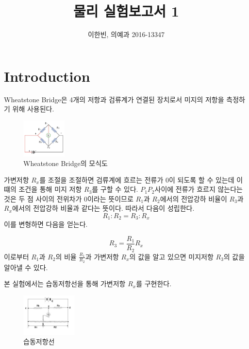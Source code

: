 \documentclass[a4paper]{article}
\title{물리 실험보고서 1}
\author{이한빈, 의예과 2016-13347}
\begin{document}
\maketitle

\section{Introduction}
 	Wheatstone Bridge은 4개의 저항과 검류계가 연결된 장치로서 미지의 저항을 측정하기 위해 사용된다.
 	\begin{figure}[h]
 		\centering
 		\includegraphics[width=0.2\textwidth]{img/wheatstone-bridge.png}
 		\caption{Wheatstone Bridge의 모식도} \label{fig:wheatstone}
 	\end{figure}

 	가변저항 $R_{x}$를 조절을 조절하면 검류계에 흐르는 전류가 0이 되도록 할 수 있는데 이 떄의 조건을 통해 미지 저항 $R_3$를 구할 수 있다.
 	$P_{1}P_{2}$사이에 전류가 흐르지 않는다는 것은 두 점 사이의 전위차가 0이라는 뜻이므로 $R_1$과 $R_2$에서의 전압강하 비율이 $R_3$과 $R_x$에서의 전압강하 비율과 같다는 뜻이다.
 	따라서 다음이 성립한다.
 	\begin{equation}
 		R_1:R_2 = R_3:R_x
 	\end{equation}
 	이를 변형하면 다음을 얻는다.

 	\begin{equation}
 		R_3 = \frac{R_1}{R_2}R_x
 		\label{eq:eq}
 	\end{equation}
 	이로부터 $R_1$과 $R_2$의 비율 $\frac{R_1}{R_2}$과 가변저항 $R_x$의 값을 알고 있으면 미지저항 $R_3$의 값을 알아낼 수 있다.

 	본 실험에서는 습동저항선을 통해 가변저항 $R_x$를 구현한다.
 	\begin{figure}[h]
 		\centering
 		\includegraphics[width=0.25\textwidth]{img/line.jpg }
 		\caption{습동저항선} \label{fig:line}
 	\end{figure}
\end{document}
